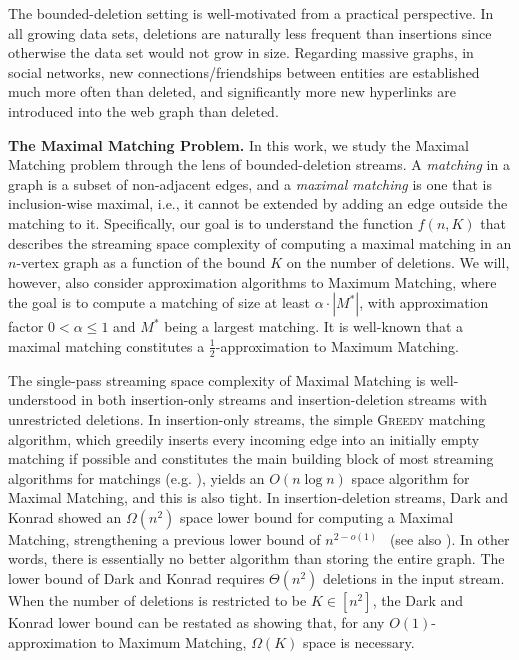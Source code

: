 \documentclass[11pt,a4paper]{article}
\begin{document}
The bounded-deletion setting is well-motivated from a practical perspective. In all growing data sets, deletions are naturally less frequent than insertions since otherwise the data set would not grow in size. Regarding massive graphs, in social networks, new connections/friendships between entities are established much more often than deleted, and significantly more new hyperlinks are introduced into the web graph than deleted. 


\smallskip
\noindent \textbf{The Maximal Matching Problem.} In this work, we study the \textsf{Maximal Matching} problem through the lens of bounded-deletion streams. A {\em matching} in a graph is a subset of non-adjacent edges, and a {\em maximal matching} is one that is inclusion-wise maximal, i.e., it cannot be extended by adding an edge outside the matching to it. Specifically, our goal is to understand the function $f(n,K)$ that describes the streaming space complexity of computing a maximal matching in an $n$-vertex graph as a function of the bound $K$ on the number of deletions. We will, however, also consider approximation algorithms to \textsf{Maximum Matching}, where the goal is to compute a matching of size at least $\alpha \cdot |M^*|$, with approximation factor $0 < \alpha \le 1$ and $M^*$ being a largest matching. It is well-known that a maximal matching constitutes a $\frac{1}{2}$-approximation to \textsf{Maximum Matching}.

The single-pass streaming space complexity of \textsf{Maximal Matching} is well-understood in both insertion-only streams and insertion-deletion streams with unrestricted deletions. In insertion-only streams, the simple \textsc{Greedy} matching algorithm, which greedily inserts every incoming edge into an initially empty matching if possible and constitutes the main building block of most streaming algorithms for matchings (e.g. \cite{fkmsz04,k18,kk20,alt21,kn21,kns23}), yields an $O(n \log n)$ space algorithm for \textsf{Maximal Matching}, and this is also tight. In insertion-deletion streams, Dark and Konrad \cite{dk20} showed an $\Omega(n^2)$ space lower bound for computing a \textsf{Maximal Matching}, strengthening a previous lower bound of $n^{2-o(1)}$~\cite{akl16} (see also \cite{k15}). In other words, there is essentially no better algorithm than storing the entire graph. The lower bound of Dark and Konrad requires $\Theta(n^2)$ deletions in the input stream.  When the number of deletions is restricted to be $K \in [n^2]$, the Dark and Konrad lower bound can be restated as showing that, for any $O(1)$-approximation to \textsf{Maximum Matching}, $\Omega(K)$ space is necessary. 
\end{document}
